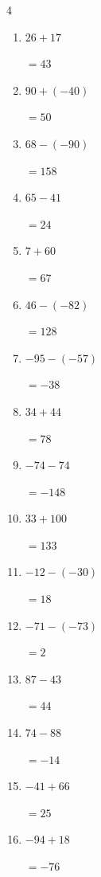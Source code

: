 \begin{multicols}{4}
\begin{enumerate}
        $=-30$

  \item $26+17$

        $=43$

  \item $90+(-40)$

        $=50$

  \item $68-(-90)$

        $=158$

  \item $65-41$

        $=24$

  \item $7+60$

        $=67$

  \item $46-(-82)$

        $=128$

\columnbreak %

\resetques

  \item $-95-(-57)$

        $=-38$

  \item $34+44$

        $=78$

  \item $-74-74$

        $=-148$

  \item $33+100$

        $=133$

  \item $-12-(-30)$

        $=18$

  \item $-71-(-73)$

        $=2$

  \item $87-43$

        $=44$

  \item $74-88$

        $=-14$

  \item $-41+66$

        $=25$

  \item $-94+18$

        $=-76$


\end{enumerate}
\end{multicols}
